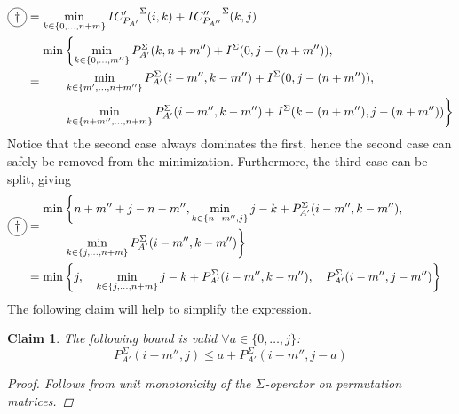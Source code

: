 \documentclass[twoside,11pt,openright]{report}
\newcommand*{\circled}[1]{\tikz[baseline=(char.base)]{
                          \node[shape=circle,draw,inner sep=2pt] (char) {#1};}}
\newtheorem{claim}{Claim}
\begin{document}
\begin{align*}
  \circled{$\dagger$} &= \min_{k\in \{ 0, \dots, n + m \}} { {IC'_{P_{A'}}}^{\Sigma}(i, k) + {IC''_{P_{A''}}}^{\Sigma}(k, j) } \\
              &=  \begin{aligned} \min
                    &\left\{
                      \min_{k \in \{0, \dots, m''\}} { P_{A'}^{\Sigma}(k, n + m'') + I^{\Sigma}(0, j - (n + m'')) }, \right. \\
                    &\left.
                      \min_{k \in \{m', \dots, n + m''\}} {P_{A'}^{\Sigma}(i - m'', k - m'') + I^{\Sigma}(0, j - (n + m''))}, \right. \\
                    &\left.
                      \min_{k \in \{ n + m'', \dots, n + m \}} {P_{A'}^{\Sigma}(i - m'', k - m'') + I^{\Sigma}(k - (n + m''), j - (n + m''))}
                    \right\}
                  \end{aligned}
\end{align*}
Notice that the second case always dominates the first, hence the second case can safely be removed from the minimization. Furthermore, the third case can be split, giving
\begin{align*}
  \circled{$\dagger$} &=  \begin{aligned} \min
                    &\left\{
                      n + m'' + j - n - m'',
                      \min_{k \in \{n + m'', j\}} {j - k + P_{A'}^{\Sigma}(i - m'', k - m'')}, \right. \\
                    &\left.
                      \min_{k \in \{j, \dots, n + m\}} {P_{A'}^{\Sigma}(i - m'', k - m'')}
                    \right\}
                  \end{aligned} \\
              &= \begin{aligned} \min
                    &\left\{
                      j,\quad
                      \min_{k \in \{j, \dots, n + m\}} {j - k + P_{A'}^{\Sigma}(i - m'', k - m'')},\quad
                      P_{A'}^{\Sigma}(i - m'', j - m'')
                    \right\}
                  \end{aligned}
\end{align*}
The following claim will help to simplify the expression.
\begin{claim}
  \label{claim:bounding-sigma-col}
  The following bound is valid $\forall a \in \{0, \dots, j\}$:
  \[
    P_{A'}^{\Sigma}(i - m'', j) \leq a + P_{A'}^{\Sigma}(i - m'', j - a)
  \]
  \begin{proof}
    Follows from unit monotonicity of the $\Sigma$-operator on permutation matrices.
  \end{proof}
\end{claim}
\end{document}
